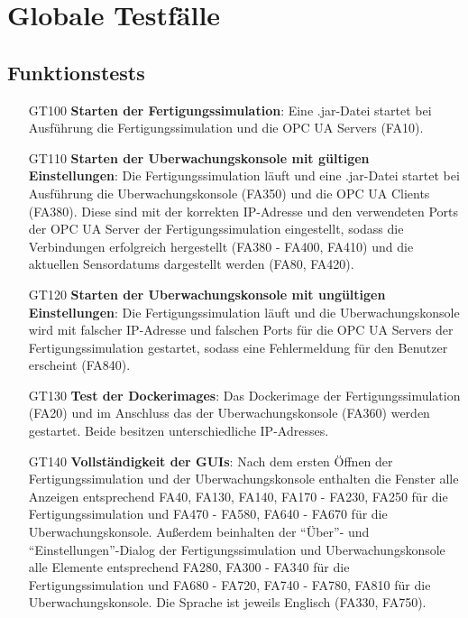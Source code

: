 \documentclass[parskip=full]{scrartcl}
\begin{document}
\pagebreak
\section{Globale Testfälle}
\subsection{Funktionstests}
\begin{enumerate}
  \item[GT100] \textbf{Starten der \gls{Fertigungssimulation}}: Eine .jar-Datei startet bei Ausführung die \gls{Fertigungssimulation} und die \glspl{OPC UA Server} (FA10).
  \item[GT110] \textbf{Starten der \gls{Uberwachungskonsole} mit gültigen Einstellungen}: Die \gls{Fertigungssimulation} läuft und eine .jar-Datei startet
   bei Ausführung die \gls{Uberwachungskonsole} (FA350) und die \glspl{OPC UA Client} (FA380). Diese sind mit der korrekten \gls{IP-Adresse} und den verwendeten Ports der \gls{OPC UA Server}
   der \gls{Fertigungssimulation} eingestellt, sodass die Verbindungen erfolgreich hergestellt (FA380 - FA400, FA410) und die aktuellen \glspl{Sensordatum}
   dargestellt werden (FA80, FA420).
  \item[GT120] \textbf{Starten der \gls{Uberwachungskonsole} mit ungültigen Einstellungen}: Die \gls{Fertigungssimulation} läuft und die \gls{Uberwachungskonsole} wird mit falscher
   \gls{IP-Adresse} und falschen Ports für die \glspl{OPC UA Server} der \gls{Fertigungssimulation} gestartet, sodass eine Fehlermeldung für den Benutzer erscheint (FA840).
  \item[GT130] \textbf{Test der \glspl{Dockerimage}}: Das \gls{Dockerimage} der \gls{Fertigungssimulation} (FA20) und im Anschluss das der \gls{Uberwachungskonsole} (FA360) werden gestartet. Beide besitzen unterschiedliche \glspl{IP-Adresse}.
  \item[GT140] \textbf{Vollständigkeit der \glspl{GUI}}: Nach dem ersten Öffnen der \gls{Fertigungssimulation} und der \gls{Uberwachungskonsole} enthalten die Fenster alle Anzeigen
   entsprechend FA40, FA130, FA140, FA170 - FA230, FA250 für die \gls{Fertigungssimulation} und
   FA470 - FA580, FA640 - FA670 für die \gls{Uberwachungskonsole}.
   Außerdem beinhalten der "`Über"'- und "`Einstellungen"'-Dialog der \gls{Fertigungssimulation} und \gls{Uberwachungskonsole} alle Elemente entsprechend
   FA280, FA300 - FA340 für die \gls{Fertigungssimulation} und FA680 - FA720, FA740 - FA780, FA810 für die \gls{Uberwachungskonsole}.
   Die Sprache ist jeweils Englisch (FA330, FA750).

\end{enumerate}
\end{document}
